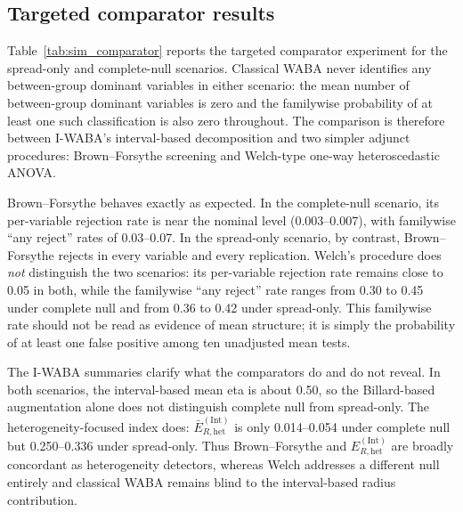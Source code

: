 \documentclass[preprint, times, 12pt, authoryear]{elsarticle}
\begin{document}
\subsection{Targeted comparator results}\label{sec:sim_comparator}

Table~\ref{tab:sim_comparator} reports the targeted comparator experiment for the spread-only and complete-null scenarios. Classical WABA never identifies any between-group dominant variables in either scenario: the mean number of between-group dominant variables is zero and the familywise probability of at least one such classification is also zero throughout. The comparison is therefore between I-WABA's interval-based decomposition and two simpler adjunct procedures: Brown--Forsythe screening and Welch-type one-way heteroscedastic ANOVA.

Brown--Forsythe behaves exactly as expected. In the complete-null scenario, its per-variable rejection rate is near the nominal level (0.003--0.007), with familywise ``any reject'' rates of 0.03--0.07. In the spread-only scenario, by contrast, Brown--Forsythe rejects in every variable and every replication. Welch's procedure does \emph{not} distinguish the two scenarios: its per-variable rejection rate remains close to 0.05 in both, while the familywise ``any reject'' rate ranges from 0.30 to 0.45 under complete null and from 0.36 to 0.42 under spread-only. This familywise rate should not be read as evidence of mean structure; it is simply the probability of at least one false positive among ten unadjusted mean tests.

The I-WABA summaries clarify what the comparators do and do not reveal. In both scenarios, the interval-based mean eta is about 0.50, so the Billard-based augmentation alone does not distinguish complete null from spread-only. The heterogeneity-focused index does: $\bar E_{R,\mathrm{het}}^{(\mathrm{Int})}$ is only 0.014--0.054 under complete null but 0.250--0.336 under spread-only. Thus Brown--Forsythe and $E_{R,\mathrm{het}}^{(\mathrm{Int})}$ are broadly concordant as heterogeneity detectors, whereas Welch addresses a different null entirely and classical WABA remains blind to the interval-based radius contribution.
\end{document}
